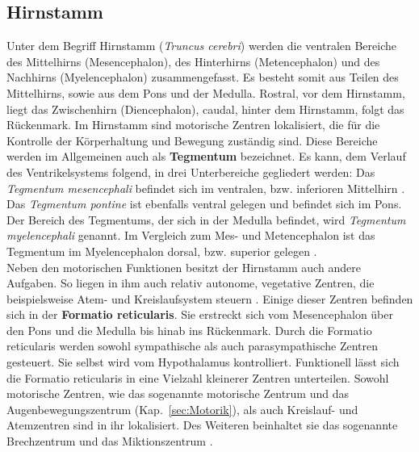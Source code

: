 \subsection{Hirnstamm}
\label{subsec:Hirnstamm} 

Unter dem Begriff Hirnstamm (\textit{Truncus cerebri}) werden die ventralen Bereiche des Mittelhirns (Mesencephalon), des Hinterhirns (Metencephalon) und des Nachhirns (Myelencephalon) zusammengefasst. Es besteht somit aus Teilen des Mittelhirns, sowie aus dem Pons und der Medulla. Rostral, vor dem Hirnstamm, liegt das Zwischenhirn (Diencephalon), caudal, hinter dem Hirnstamm, folgt das Rückenmark. Im Hirnstamm sind motorische Zentren lokalisiert, die für die Kontrolle der Körperhaltung und Bewegung zuständig sind. Diese Bereiche werden im Allgemeinen auch als \textbf{Tegmentum} bezeichnet. Es kann, dem Verlauf des Ventrikelsystems folgend, in drei Unterbereiche gegliedert werden: Das \textit{Tegmentum mesencephali} befindet sich im ventralen, bzw. inferioren Mittelhirn \textsuperscript{\cite[Kap.~6]{trepel2011neuroanatomie}}. Das \textit{Tegmentum pontine} ist ebenfalls ventral gelegen und befindet sich im Pons. Der Bereich des Tegmentums, der sich in der Medulla befindet, wird \textit{Tegmentum myelencephali} genannt. Im Vergleich zum Mes- und Metencephalon ist das Tegmentum im Myelencephalon dorsal, bzw. superior gelegen \textsuperscript{\cite[Kap.~5]{trepel2011neuroanatomie}}.\\

\noindent Neben den motorischen Funktionen besitzt der Hirnstamm auch andere Aufgaben. So liegen in ihm auch relativ autonome, vegetative Zentren, die beispielsweise Atem- und Kreislaufsystem steuern \textsuperscript{\cite[Kap.~14]{penzlin2005tierphys}}. Einige dieser Zentren befinden sich in der \textbf{Formatio reticularis}. Sie erstreckt sich vom Mesencephalon über den Pons und die Medulla bis hinab ins Rückenmark. Durch die Formatio reticularis werden sowohl sympathische als auch parasympathische Zentren gesteuert. Sie selbst wird vom Hypothalamus kontrolliert. Funktionell lässt sich die Formatio reticularis in eine Vielzahl kleinerer Zentren unterteilen. Sowohl motorische Zentren, wie das sogenannte motorische Zentrum und das Augenbewegungszentrum (Kap.~\ref{sec:Motorik}), als auch Kreislauf- und Atemzentren sind in ihr lokalisiert. Des Weiteren beinhaltet sie das sogenannte Brechzentrum und das Miktionszentrum \textsuperscript{\cite[Kap.~6]{trepel2011neuroanatomie}}.






